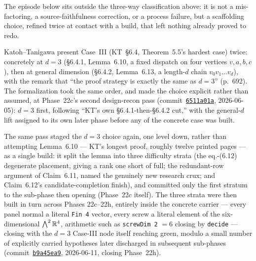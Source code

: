 The episode below sits outside the three-way classification above: it is
not a mis-factoring, a source-faithfulness correction, or a process
failure, but a scaffolding choice, refined twice at contact with a build,
that left nothing already proved to redo.

Katoh--Tanigawa present Case~III (KT~\S6.4, Theorem~5.5's hardest case)
twice: concretely at $d = 3$ (\S6.4.1, Lemma~6.10, a fixed dispatch on
four vertices $v, a, b, c$), then at general dimension (\S6.4.2,
Lemma~6.13, a length-$d$ chain $v_0 v_1 \dots v_d$), with the remark
that ``the proof strategy is exactly the same as $d = 3$'' (p.~692). The
formalization took the same order, and made the choice explicit rather
than assumed, at Phase~22c's second design-recon pass
(commit~\href{https://github.com/bryangingechen/CombinatorialRigidity/commit/6511a01abb7b7dd4ad1b7b077fc2e341d1d635b7}{\texttt{6511a01a}},
2026-06-05): $d = 3$ first, following ``KT's own \S6.4.1-then-\S6.4.2
cut,'' with the general-$d$ lift assigned to its own later phase before
any of the concrete case was built.

The same pass staged the $d = 3$ choice again, one level down, rather
than attempting Lemma~6.10 --- KT's longest proof, roughly twelve
printed pages --- as a single build: it split the lemma into three
difficulty strata (the eq.-(6.12) degenerate placement, giving a rank
one short of full; the redundant-row argument of Claim~6.11, named the
genuinely new research crux; and Claim~6.12's candidate-completion
finish), and committed only the first stratum to the sub-phase then
opening (Phase~22c itself). The three strata were then built in turn
across Phases 22c--22h, entirely inside the concrete carrier --- every
panel normal a literal \texttt{Fin 4} vector, every screw a literal
element of the six-dimensional $\bigwedge^2{\mathbb{R}}^4$, arithmetic such as
\texttt{screwDim 2} $= 6$ closing by \texttt{decide} --- closing with
the $d = 3$ Case-III node itself reaching green, modulo a small number
of explicitly carried hypotheses later discharged in subsequent
sub-phases
(commit~\href{https://github.com/bryangingechen/CombinatorialRigidity/commit/b9a45ea909479a5d88e34a7030434141b09ff6e5}{\texttt{b9a45ea9}},
2026-06-11, closing Phase~22h).

